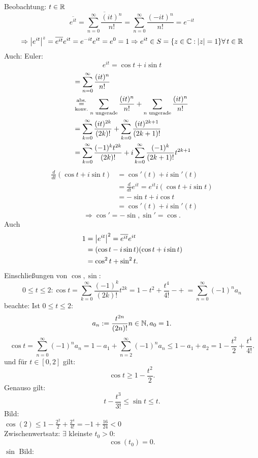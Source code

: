 \documentclass[../ana2.tex]{subfiles}
\begin{document}
\begin{bew}
\begin{enumerate}[label=(\alph*)]
Beobachtung: \( t \in \mathbb{R} \)
\[ \overline{e^{it}} = \overline{\sum_{n=0}^{\infty} \frac{(it)^n}{n!}}
= \sum_{n=0}^{\infty} \frac{(-it)^n}{n!} = e^{-it} \]
\[ \Rightarrow \abs{e^{it}}^z = \overline{e^{it}}e^{it} = e^{-it} e^{it}
= e^0 = 1 \Rightarrow e^{it} \in S = \set{z \in \C: \abs{z} = 1} \forall t \in \R \]
Auch: Euler:
\[ e^{it} = \cos t + i\sin t \]
\begin{align*}
    &= \sum_{n=0}^{\infty} \frac{(it)^n}{n!} \\
    &\overset{\text{abs.}}{\underset{\text{konv.}}{=}}
    \sum_{n \text{ ungerade}} \frac{(it)^n}{n!} + \sum_{n \text{ ungerade}} \frac{(it)^n}{n!} \\
    &= \sum_{k=0}^{\infty} \frac{(it)^{2k}}{(2k)!} 
    + \sum_{k=0}^{\infty} \frac{(it)^{2k + 1}}{(2k + 1)!} \\
    &= \sum_{k=0}^{\infty} \frac{(-1)^k t^{2k}}{(2k)!} 
    + i \sum_{k=0}^{\infty} \frac{(-1)^k}{(2k+1)!}t^{2k+1}
\end{align*}
\begin{align*}
    \frac{d}{dt} (\cos t + i \sin t) &= \cos'(t) + i \sin'(t) \\
    &= \frac{d}{dt} e^{it} = e^{it} i(\cos t + i \sin t) \\
    &= -\sin t + i \cos t \\
    &= \cos'(t) + i \sin'(t)
\end{align*}
\[ \Rightarrow \cos' = -\sin, \sin' = \cos. \]
Auch 
\begin{align*}
    1 &= \left| e^{it} \right|^2 = \overline{e^{it}} e^{it} \\
    &= (\cos t - i \sin t)(\cos t + i \sin t) \\
    &= \cos^2 t + \sin^2 t.
\end{align*}
Einschließungen von \( \cos, \sin \):
\[ 0 \leq t \leq 2: \cos t = \sum_{k=0}^{\infty} \frac{(-1)^k}{(2k)!}t^{2k}
= 1 - t^2 + \frac{t^4}{4!} -+ \ = \sum_{n=0}^{\infty} (-1)^n a_n \]
beachte: Ist \( 0 \leq t \leq 2 \): 
\[ a_n := \frac{t^{2n}}{(2n)!} n\in\mathbb{N}, a_0 = 1. \]
\[ \cos t = \sum_{n=0}^\infty (-1)^n a_n 
= 1 - a_1 + \sum_{n=2}^\infty (-1)^n a_n 
\leq 1 - a_1 + a_2 = 1 - \frac{t^2}{2} + \frac{t^4}{4!}. \]
und für \( t\in [0,2] \) gilt: 
\[ \cos t \geq 1 - \frac{t^2}{2}. \] 
Genauso gilt: 
\[ t-\frac{t^3}{3!} \leq \sin t \leq t. \]
Bild:\\
\( \cos(2) \leq 1 - \frac{2^2}{2} + \frac{2^4}{4!} 
= -1 + \frac{16}{24} < 0 \) \\
Zwischenwertsatz: \( \exists \) kleinste \( t_0 > 0 \): 
\[ \cos(t_0) = 0. \]
\( \sin \) Bild:

\end{enumerate}
\end{bew}
\end{document}
